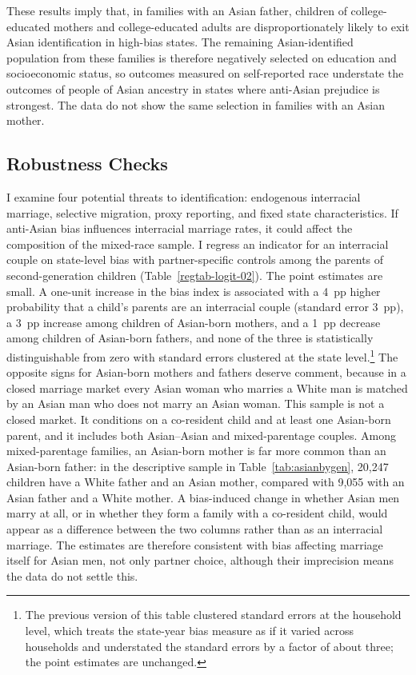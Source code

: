 These results imply that, in families with an Asian father, children of college-educated mothers and college-educated adults are disproportionately likely to exit Asian identification in high-bias states. The remaining Asian-identified population from these families is therefore negatively selected on education and socioeconomic status, so outcomes measured on self-reported race understate the outcomes of people of Asian ancestry in states where anti-Asian prejudice is strongest. The data do not show the same selection in families with an Asian mother.

\subsection{Robustness Checks}\label{sec:robcheck}

I examine four potential threats to identification: endogenous interracial marriage, selective migration, proxy reporting, and fixed state characteristics. If anti-Asian bias influences interracial marriage rates, it could affect the composition of the mixed-race sample. I regress an indicator for an interracial couple on state-level bias with partner-specific controls among the parents of second-generation children (Table~\ref{regtab-logit-02}). The point estimates are small. A one-unit increase in the bias index is associated with a 4~pp higher probability that a child's parents are an interracial couple (standard error 3~pp), a 3~pp increase among children of Asian-born mothers, and a 1~pp decrease among children of Asian-born fathers, and none of the three is statistically distinguishable from zero with standard errors clustered at the state level.\footnote{The previous version of this table clustered standard errors at the household level, which treats the state-year bias measure as if it varied across households and understated the standard errors by a factor of about three; the point estimates are unchanged.} The opposite signs for Asian-born mothers and fathers deserve comment, because in a closed marriage market every Asian woman who marries a White man is matched by an Asian man who does not marry an Asian woman. This sample is not a closed market. It conditions on a co-resident child and at least one Asian-born parent, and it includes both Asian--Asian and mixed-parentage couples. Among mixed-parentage families, an Asian-born mother is far more common than an Asian-born father: in the descriptive sample in Table~\ref{tab:asianbygen}, 20,247 children have a White father and an Asian mother, compared with 9,055 with an Asian father and a White mother. A bias-induced change in whether Asian men marry at all, or in whether they form a family with a co-resident child, would appear as a difference between the two columns rather than as an interracial marriage. The estimates are therefore consistent with bias affecting marriage itself for Asian men, not only partner choice, although their imprecision means the data do not settle this.


